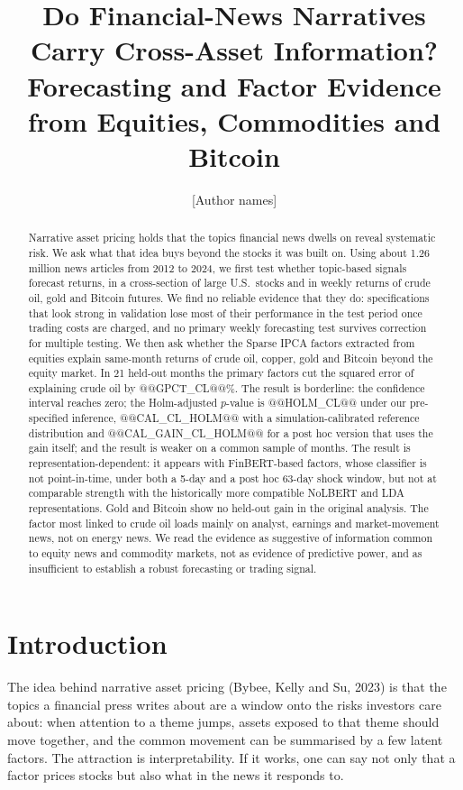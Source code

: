 \documentclass[11pt]{article}
\title{Do Financial-News Narratives Carry Cross-Asset Information?\\
Forecasting and Factor Evidence from Equities, Commodities and Bitcoin}
\author{[Author names]}
\date{}
\begin{document}
\maketitle

\begin{abstract}
\noindent Narrative asset pricing holds that the topics financial news dwells on reveal systematic risk. We ask what that idea buys beyond the stocks it was built on. Using about 1.26 million news articles from 2012 to 2024, we first test whether topic-based signals forecast returns, in a cross-section of large U.S.\ stocks and in weekly returns of crude oil, gold and Bitcoin futures. We find no reliable evidence that they do: specifications that look strong in validation lose most of their performance in the test period once trading costs are charged, and no primary weekly forecasting test survives correction for multiple testing. We then ask whether the Sparse IPCA factors extracted from equities explain same-month returns of crude oil, copper, gold and Bitcoin beyond the equity market. In 21 held-out months the primary factors cut the squared error of explaining crude oil by @@GPCT_CL@@\%. The result is borderline: the confidence interval reaches zero; the Holm-adjusted $p$-value is @@HOLM_CL@@ under our pre-specified inference, @@CAL_CL_HOLM@@ with a simulation-calibrated reference distribution and @@CAL_GAIN_CL_HOLM@@ for a post hoc version that uses the gain itself; and the result is weaker on a common sample of months. The result is representation-dependent: it appears with FinBERT-based factors, whose classifier is not point-in-time, under both a 5-day and a post hoc 63-day shock window, but not at comparable strength with the historically more compatible NoLBERT and LDA representations. Gold and Bitcoin show no held-out gain in the original analysis. The factor most linked to crude oil loads mainly on analyst, earnings and market-movement news, not on energy news. We read the evidence as suggestive of information common to equity news and commodity markets, not as evidence of predictive power, and as insufficient to establish a robust forecasting or trading signal.
\end{abstract}

\section{Introduction}

The idea behind narrative asset pricing (Bybee, Kelly and Su, 2023) is that the topics a financial press writes about are a window onto the risks investors care about: when attention to a theme jumps, assets exposed to that theme should move together, and the common movement can be summarised by a few latent factors. The attraction is interpretability. If it works, one can say not only that a factor prices stocks but also what in the news it responds to.
\end{document}
